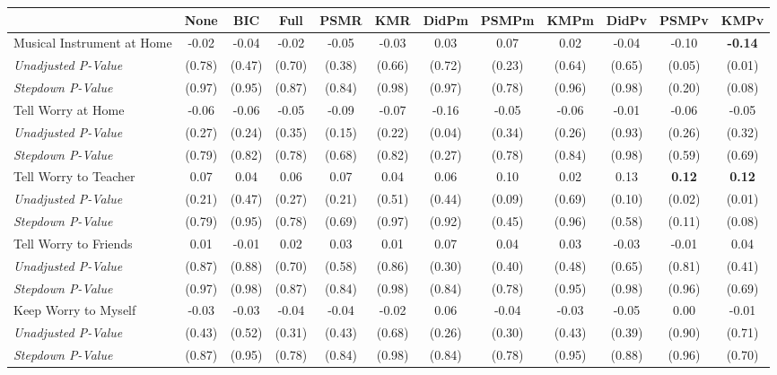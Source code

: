 \begin{tabular}{l c c c c c c c c c c c}
\toprule
 & None & BIC & Full & PSMR & KMR & DidPm & PSMPm & KMPm & DidPv & PSMPv & KMPv \\
\midrule
Musical Instrument at Home & -0.02 & -0.04 & -0.02 & -0.05 & -0.03 & 0.03 & 0.07 & 0.02 & -0.04 & -0.10 & \textbf{ -0.14 } \\
\quad \textit{Unadjusted P-Value} & (0.78) & (0.47) & (0.70) & (0.38) & (0.66) & (0.72) & (0.23) & (0.64) & (0.65) & (0.05) & (0.01) \\
\quad \textit{Stepdown P-Value} & (0.97) & (0.95) & (0.87) & (0.84) & (0.98) & (0.97) & (0.78) & (0.96) & (0.98) & (0.20) & (0.08) \\
Tell Worry at Home & -0.06 & -0.06 & -0.05 & -0.09 & -0.07 & -0.16 & -0.05 & -0.06 & -0.01 & -0.06 & -0.05 \\
\quad \textit{Unadjusted P-Value} & (0.27) & (0.24) & (0.35) & (0.15) & (0.22) & (0.04) & (0.34) & (0.26) & (0.93) & (0.26) & (0.32) \\
\quad \textit{Stepdown P-Value} & (0.79) & (0.82) & (0.78) & (0.68) & (0.82) & (0.27) & (0.78) & (0.84) & (0.98) & (0.59) & (0.69) \\
Tell Worry to Teacher & 0.07 & 0.04 & 0.06 & 0.07 & 0.04 & 0.06 & 0.10 & 0.02 & 0.13 & \textbf{ 0.12 } & \textbf{ 0.12 } \\
\quad \textit{Unadjusted P-Value} & (0.21) & (0.47) & (0.27) & (0.21) & (0.51) & (0.44) & (0.09) & (0.69) & (0.10) & (0.02) & (0.01) \\
\quad \textit{Stepdown P-Value} & (0.79) & (0.95) & (0.78) & (0.69) & (0.97) & (0.92) & (0.45) & (0.96) & (0.58) & (0.11) & (0.08) \\
Tell Worry to Friends & 0.01 & -0.01 & 0.02 & 0.03 & 0.01 & 0.07 & 0.04 & 0.03 & -0.03 & -0.01 & 0.04 \\
\quad \textit{Unadjusted P-Value} & (0.87) & (0.88) & (0.70) & (0.58) & (0.86) & (0.30) & (0.40) & (0.48) & (0.65) & (0.81) & (0.41) \\
\quad \textit{Stepdown P-Value} & (0.97) & (0.98) & (0.87) & (0.84) & (0.98) & (0.84) & (0.78) & (0.95) & (0.98) & (0.96) & (0.69) \\
Keep Worry to Myself & -0.03 & -0.03 & -0.04 & -0.04 & -0.02 & 0.06 & -0.04 & -0.03 & -0.05 & 0.00 & -0.01 \\
\quad \textit{Unadjusted P-Value} & (0.43) & (0.52) & (0.31) & (0.43) & (0.68) & (0.26) & (0.30) & (0.43) & (0.39) & (0.90) & (0.71) \\
\quad \textit{Stepdown P-Value} & (0.87) & (0.95) & (0.78) & (0.84) & (0.98) & (0.84) & (0.78) & (0.95) & (0.88) & (0.96) & (0.70) \\

\end{tabular}
